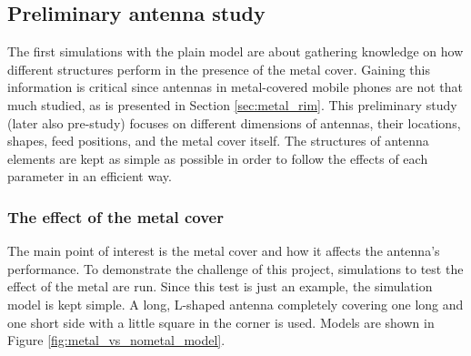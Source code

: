\subsection{Preliminary antenna study}
\label{sec:pre_study}
The first simulations with the plain model are about gathering knowledge on how different structures perform in the presence of the metal cover. Gaining this information is critical since antennas in metal-covered mobile phones are not that much studied, as is presented in Section \ref{sec:metal_rim}. This preliminary study (later also pre-study) focuses on different dimensions of antennas, their locations, shapes, feed positions, and the metal cover itself. The structures of antenna elements are kept as simple as possible in order to follow the effects of each parameter in an efficient way. 


\subsubsection{The effect of the metal cover}
\label{sec:metal_effect}
The main point of interest is the metal cover and how it affects the antenna's performance. To demonstrate the challenge of this project, simulations to test the effect of the metal are run. Since this test is just an example, the simulation model is kept simple. A long, L-shaped antenna completely covering one long and one short side with a little square in the corner is used. Models are shown in Figure \ref{fig:metal_vs_nometal_model}.

